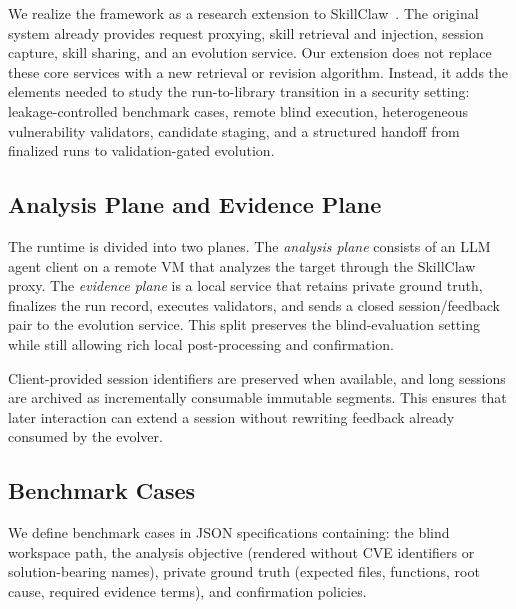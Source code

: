 ﻿\documentclass[preprint,12pt]{elsarticle}
\begin{document}
We realize the framework as a research extension to
SkillClaw~\cite{skillclaw}.  The original system already provides request
proxying, skill retrieval and injection, session capture, skill sharing,
and an evolution service.  Our extension does not replace these core
services with a new retrieval or revision algorithm.  Instead, it adds the
elements needed to study the run-to-library transition in a security
setting: leakage-controlled benchmark cases, remote blind execution,
heterogeneous vulnerability validators, candidate staging, and a structured
handoff from finalized runs to validation-gated evolution.

\subsection{Analysis Plane and Evidence Plane}

The runtime is divided into two planes.  The \emph{analysis plane} consists
of an LLM agent client on a remote VM that analyzes the target through the
SkillClaw proxy.  The \emph{evidence plane} is a local service that retains
private ground truth, finalizes the run record, executes validators, and
sends a closed session/feedback pair to the evolution service.  This split
preserves the blind-evaluation setting while still allowing rich local
post-processing and confirmation.

Client-provided session identifiers are preserved when available, and long
sessions are archived as incrementally consumable immutable segments.  This
ensures that later interaction can extend a session without rewriting
feedback already consumed by the evolver.

\subsection{Benchmark Cases}

We define benchmark cases in JSON specifications containing: the blind
workspace path, the analysis objective (rendered without CVE identifiers or
solution-bearing names), private ground truth (expected files, functions,
root cause, required evidence terms), and confirmation policies.
\end{document}
